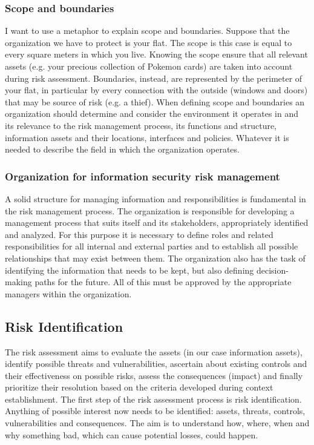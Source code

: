 \subsubsection{Scope and boundaries}
I want to use a metaphor to explain scope and boundaries. Suppose that the organization we have to protect is your flat. The scope is this case is equal to every square meters in which you live. Knowing the scope ensure that all relevant assets (e.g. your precious collection of Pokemon cards) are taken into account during risk assessment. Boundaries, instead, are represented by the perimeter of your flat, in particular by every connection with the outside (windows and doors) that may be source of risk (e.g. a thief). When defining scope and boundaries an organization should determine and consider the environment it operates in and its relevance to the risk management process, its functions and structure, information assets and their locations, interfaces and policies. Whatever it is needed to describe the field in which the organization operates.
\subsubsection{Organization for information security risk management}
A solid structure for managing information and responsibilities is fundamental in the risk management process. The organization is responsible for developing a management process that suits itself and its stakeholders, appropriately identified and analyzed. For this purpose it is necessary to define roles and related responsibilities for all internal and external parties and to establish all possible relationships that may exist between them. The organization also has the task of identifying the information that needs to be kept, but also defining decision-making paths for the future. All of this must be approved by the appropriate managers within the organization.
\subsection{Risk Identification}
The risk assessment aims to evaluate the assets (in our case information assets), identify possible threats and vulnerabilities, ascertain about existing controls and their effectiveness on possible risks, assess the consequences (impact) and finally prioritize their resolution based on the criteria developed during context establishment. The first step of the risk assessment process is risk identification. Anything of possible interest now needs to be identified: assets, threats, controls, vulnerabilities and consequences. The aim is to understand how, where, when and why something bad, which can cause potential losses, could happen.
